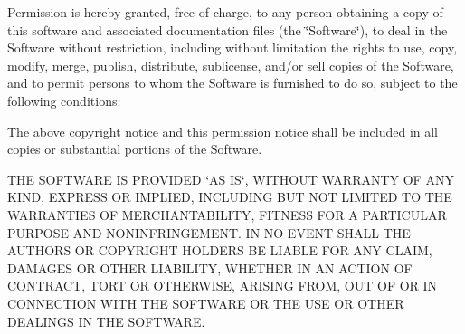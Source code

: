 \-Permission is hereby granted, free of charge, to any person obtaining a copy of this software and associated documentation files (the \char`\"{}\-Software\char`\"{}), to deal in the \-Software without restriction, including without limitation the rights to use, copy, modify, merge, publish, distribute, sublicense, and/or sell copies of the \-Software, and to permit persons to whom the \-Software is furnished to do so, subject to the following conditions\-:

\-The above copyright notice and this permission notice shall be included in all copies or substantial portions of the \-Software.

\-T\-H\-E \-S\-O\-F\-T\-W\-A\-R\-E \-I\-S \-P\-R\-O\-V\-I\-D\-E\-D \char`\"{}\-A\-S I\-S\char`\"{}, \-W\-I\-T\-H\-O\-U\-T \-W\-A\-R\-R\-A\-N\-T\-Y \-O\-F \-A\-N\-Y \-K\-I\-N\-D, \-E\-X\-P\-R\-E\-S\-S \-O\-R \-I\-M\-P\-L\-I\-E\-D, \-I\-N\-C\-L\-U\-D\-I\-N\-G \-B\-U\-T \-N\-O\-T \-L\-I\-M\-I\-T\-E\-D \-T\-O \-T\-H\-E \-W\-A\-R\-R\-A\-N\-T\-I\-E\-S \-O\-F \-M\-E\-R\-C\-H\-A\-N\-T\-A\-B\-I\-L\-I\-T\-Y, \-F\-I\-T\-N\-E\-S\-S \-F\-O\-R \-A \-P\-A\-R\-T\-I\-C\-U\-L\-A\-R \-P\-U\-R\-P\-O\-S\-E \-A\-N\-D \-N\-O\-N\-I\-N\-F\-R\-I\-N\-G\-E\-M\-E\-N\-T. \-I\-N \-N\-O \-E\-V\-E\-N\-T \-S\-H\-A\-L\-L \-T\-H\-E \-A\-U\-T\-H\-O\-R\-S \-O\-R \-C\-O\-P\-Y\-R\-I\-G\-H\-T \-H\-O\-L\-D\-E\-R\-S \-B\-E \-L\-I\-A\-B\-L\-E \-F\-O\-R \-A\-N\-Y \-C\-L\-A\-I\-M, \-D\-A\-M\-A\-G\-E\-S \-O\-R \-O\-T\-H\-E\-R \-L\-I\-A\-B\-I\-L\-I\-T\-Y, \-W\-H\-E\-T\-H\-E\-R \-I\-N \-A\-N \-A\-C\-T\-I\-O\-N \-O\-F \-C\-O\-N\-T\-R\-A\-C\-T, \-T\-O\-R\-T \-O\-R \-O\-T\-H\-E\-R\-W\-I\-S\-E, \-A\-R\-I\-S\-I\-N\-G \-F\-R\-O\-M, \-O\-U\-T \-O\-F \-O\-R \-I\-N \-C\-O\-N\-N\-E\-C\-T\-I\-O\-N \-W\-I\-T\-H \-T\-H\-E \-S\-O\-F\-T\-W\-A\-R\-E \-O\-R \-T\-H\-E \-U\-S\-E \-O\-R \-O\-T\-H\-E\-R \-D\-E\-A\-L\-I\-N\-G\-S \-I\-N \-T\-H\-E \-S\-O\-F\-T\-W\-A\-R\-E. 